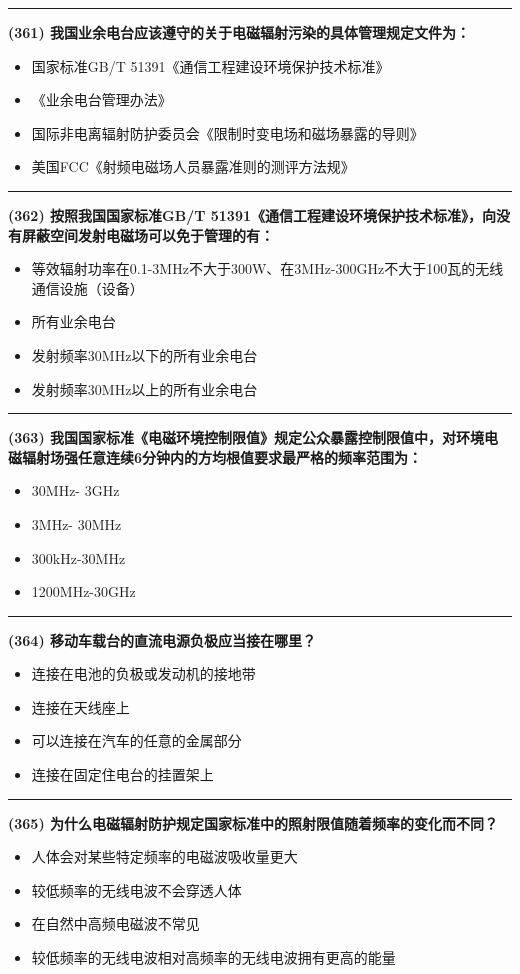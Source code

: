 \documentclass[twocolumn]{ctexart}  %
\begin{document}
\noindent\rule{0.5\textwidth}{1pt}
\heiti \textbf{(361) 我国业余电台应该遵守的关于电磁辐射污染的具体管理规定文件为： } \songti {\color{gray} [LK1002] }
\begin{itemize}
	\item  国家标准GB/T 51391《通信工程建设环境保护技术标准》
	\item  《业余电台管理办法》
	\item  国际非电离辐射防护委员会《限制时变电场和磁场暴露的导则》
	\item  美国FCC《射频电磁场人员暴露准则的测评方法规》
\end{itemize}


\noindent\rule{0.5\textwidth}{1pt}
\heiti \textbf{(362) 按照我国国家标准GB/T 51391《通信工程建设环境保护技术标准》，向没有屏蔽空间发射电磁场可以免于管理的有： } \songti {\color{gray} [LK1003] }
\begin{itemize}
	\item  等效辐射功率在0.1-3MHz不大于300W、在3MHz-300GHz不大于100瓦的无线通信设施（设备） 
	\item  所有业余电台
	\item  发射频率30MHz以下的所有业余电台
	\item  发射频率30MHz以上的所有业余电台
\end{itemize}


\noindent\rule{0.5\textwidth}{1pt}
\heiti \textbf{(363) 我国国家标准《电磁环境控制限值》规定公众暴露控制限值中，对环境电磁辐射场强任意连续6分钟内的方均根值要求最严格的频率范围为： } \songti {\color{gray} [LK1009] }
\begin{itemize}
	\item  30MHz- 3GHz
	\item  3MHz- 30MHz
	\item  300kHz-30MHz
	\item  1200MHz-30GHz
\end{itemize}


\noindent\rule{0.5\textwidth}{1pt}
\heiti \textbf{(364) 移动车载台的直流电源负极应当接在哪里？} \songti {\color{gray} [LK1128] }
\begin{itemize}
	\item  连接在电池的负极或发动机的接地带
	\item  连接在天线座上
	\item  可以连接在汽车的任意的金属部分
	\item  连接在固定住电台的挂置架上
\end{itemize}


\noindent\rule{0.5\textwidth}{1pt}
\heiti \textbf{(365) 为什么电磁辐射防护规定国家标准中的照射限值随着频率的变化而不同？} \songti {\color{gray} [LK1236] }
\begin{itemize}
	\item  人体会对某些特定频率的电磁波吸收量更大
	\item  较低频率的无线电波不会穿透人体
	\item  在自然中高频电磁波不常见
	\item  较低频率的无线电波相对高频率的无线电波拥有更高的能量
\end{itemize}
\end{document}
